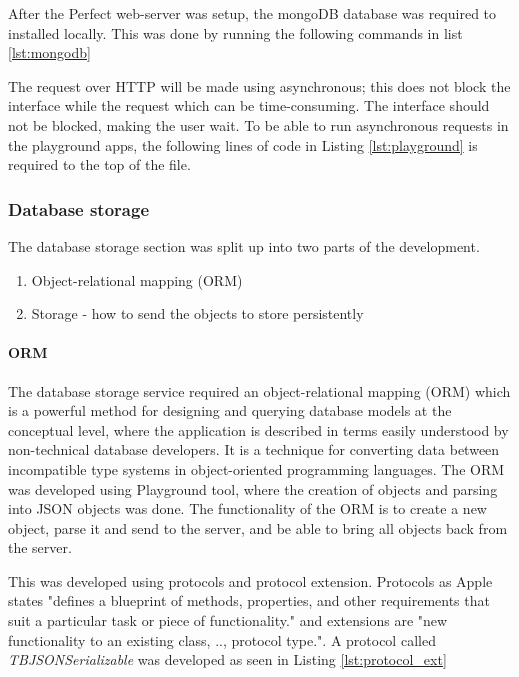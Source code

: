 After the Perfect web-server was setup, the mongoDB database was required to installed locally. This was done by running the following commands in list \ref{lst:mongodb}






The request over HTTP will be made using asynchronous; this does not block the interface while the request which can be time-consuming. The interface should not be blocked, making the user wait. To be able to run asynchronous requests in the playground apps, the following lines of code in Listing \ref{lst:playground} is required to the top of the file.

\subsubsection{Database storage}

The database storage section was split up into two parts of the development. 

\begin{enumerate}
  \item Object-relational mapping (ORM)
  \item Storage - how to send the objects to store persistently
\end{enumerate}

\paragraph{ORM}

The database storage service required an object-relational mapping (ORM) which is a powerful method for designing and querying database models at the conceptual level, where the application is described in terms easily understood by non-technical database developers. It is a technique for converting data between incompatible type systems in object-oriented programming languages. The ORM was developed using Playground tool, where the creation of objects and parsing into JSON objects was done. The functionality of the ORM is to create a new object, parse it and send to the server, and be able to bring all objects back from the server.

This was developed using protocols and protocol extension. Protocols as Apple states "defines a blueprint of methods, properties, and other requirements that suit a particular task or piece of functionality." and extensions are "new functionality to an existing class, .., protocol type.". \cite{protocol} A protocol called \textit{TBJSONSerializable} was developed as seen in Listing \ref{lst:protocol_ext}

